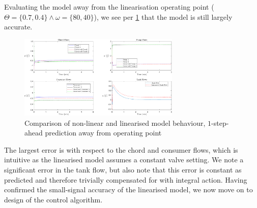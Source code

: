 Evaluating the model away from the linearisation operating point ($\Theta = \{0.7,0.4\} \wedge \omega = \{80,40\}$), we see per \cref{fig:CompNonLinNotEQ} that the model is still largely accurate.

\begin{figure}[h]
	\centering
	\includegraphics[height=4cm,width=\linewidth]{Graphics/DifferentOPFlows.pdf}
	\caption{Comparison of non-linear and linearised model behaviour, $1$-step-ahead prediction away from operating point}
	\label{fig:CompNonLinNotEQ}
\end{figure}

The largest error is with respect to the chord and consumer flows, which is intuitive as the linearised model assumes a constant valve setting. We note a significant error in the tank flow, but also note that this error is constant as predicted and therefore trivially compensated for with integral action. Having confirmed the small-signal accuracy of the linearised model, we now move on to design of the control algorithm.